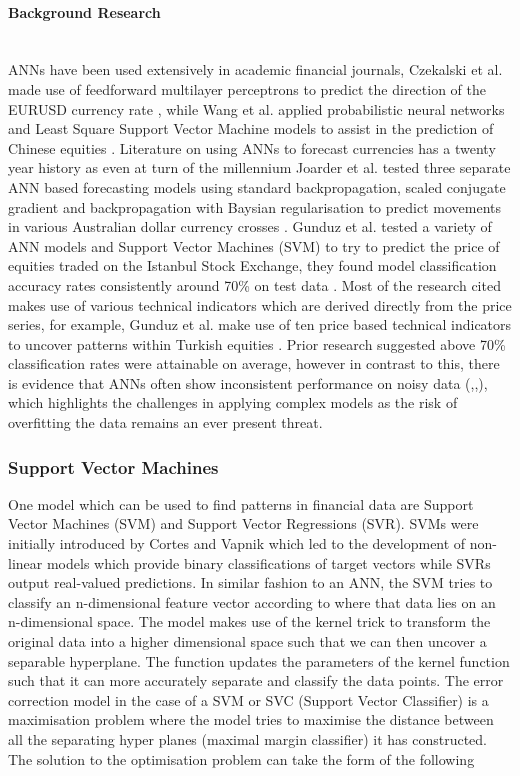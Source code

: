 \documentclass[11pt]{article}
\newcommand{\myparagraph}[1]{\paragraph{#1}\mbox{}\\}
\begin{document}
\myparagraph{Background Research}
ANNs have been used extensively in academic financial journals, Czekalski et al. made use of feedforward multilayer perceptrons to predict the direction of the EURUSD currency rate \cite{Czekalski2015}, while Wang et al. applied probabilistic neural networks and  Least Square Support Vector Machine models to assist in the prediction of Chinese equities \cite{Wang2014} . Literature on using ANNs to forecast currencies has a twenty year history as even at turn of the millennium Joarder et al.  tested three separate ANN based forecasting models using standard backpropagation, scaled conjugate gradient and backpropagation with Baysian regularisation to predict movements in various Australian dollar currency crosses \cite{Joarder2003}. Gunduz et al. tested a variety of ANN models and Support Vector Machines (SVM) to try to predict the price of equities traded on the Istanbul Stock Exchange, they found model classification accuracy rates consistently around 70\% on test data \cite{Gunduz2017} . \newline Most of the research cited makes use of various technical indicators which are derived directly from the price series, for example, Gunduz et al. make use of ten price based technical indicators to uncover patterns within Turkish equities \cite{Gunduz2017}. Prior research suggested above 70\% classification rates were attainable on average, however in contrast to this, there is evidence that ANNs often show inconsistent performance on noisy data (\cite{Kim2003},\cite{Kumar2006},\cite{Kim2000}), which highlights the challenges in applying complex models as the risk of overfitting the data remains an ever present threat. 

\subsubsection{Support Vector Machines}
One model which can be used to find patterns in financial data are Support Vector Machines (SVM) and Support Vector Regressions (SVR). SVMs were initially introduced by Cortes and Vapnik \cite{Cortes1995} which led to the development of non-linear models which provide binary classifications of target vectors while SVRs output real-valued predictions. In similar fashion to an ANN, the SVM tries to classify an n-dimensional feature vector according to where that data lies on an n-dimensional space.
\newline The model makes use of the kernel trick \cite{kerneltrick} to transform the original data into a higher dimensional space such that we can then uncover a separable hyperplane. The function updates the parameters of the kernel function such that it can more accurately separate and classify the data points. The error correction model in the case of a SVM or SVC (Support Vector Classifier) is a maximisation problem where the model tries to maximise the distance between all the separating hyper planes (maximal margin classifier) it has constructed.  The solution to the optimisation problem can take the form of the following
\end{document}
